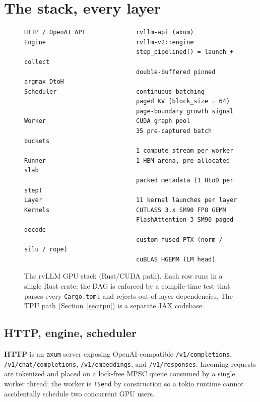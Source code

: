 \section{The stack, every layer}
\label{sec:stack}

\begin{figure}[h]
\footnotesize
\begin{verbatim}
HTTP / OpenAI API              rvllm-api (axum)
Engine                         rvllm-v2::engine
                               step_pipelined() = launch + collect
                               double-buffered pinned argmax DtoH
Scheduler                      continuous batching
                               paged KV (block_size = 64)
                               page-boundary growth signal
Worker                         CUDA graph pool
                               35 pre-captured batch buckets
                               1 compute stream per worker
Runner                         1 HBM arena, pre-allocated slab
                               packed metadata (1 HtoD per step)
Layer                          11 kernel launches per layer
Kernels                        CUTLASS 3.x SM90 FP8 GEMM
                               FlashAttention-3 SM90 paged decode
                               custom fused PTX (norm / silu / rope)
                               cuBLAS HGEMM (LM head)
\end{verbatim}
\caption{The rvLLM GPU stack (Rust/CUDA path). Each row runs in a single
Rust crate; the DAG is enforced by a compile-time test that parses every
\texttt{Cargo.toml} and rejects out-of-layer dependencies. The TPU path
(Section~\ref{sec:tpu}) is a separate JAX codebase.}
\label{fig:stack}
\end{figure}

\subsection{HTTP, engine, scheduler}

\textbf{HTTP} is an \texttt{axum} server exposing OpenAI-compatible
\texttt{/v1/completions}, \texttt{/v1/chat/completions},
\texttt{/v1/embeddings}, and \texttt{/v1/responses}. Incoming requests are
tokenized and placed on a lock-free MPSC queue consumed by a single worker
thread; the worker is \texttt{!Send} by construction so a tokio runtime
cannot accidentally schedule two concurrent GPU users.

